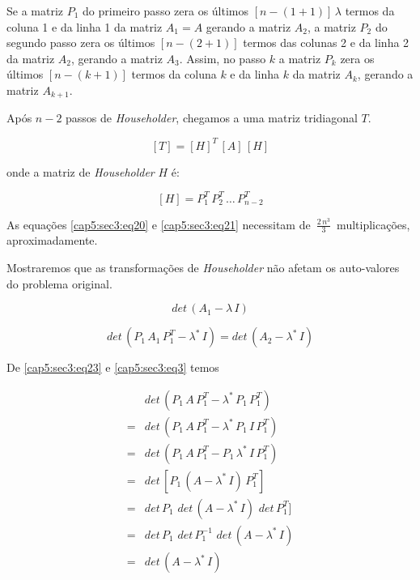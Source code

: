 Se a matriz $ P_1 $ do primeiro passo zera os últimos $ [n - (1+1)] \, \lambda $ termos da coluna 1 e da linha 1 da matriz $ A_1 = A $ gerando a matriz $ A_2 $, a matriz $ P_2 $ do segundo passo zera os últimos $ [n - (2+1)] $ termos das colunas 2 e da linha 2 da matriz $ A_2 $, gerando a matriz $ A_3 $. Assim, no passo $ k $ a matriz $ P_k $ zera os últimos $ [n - (k+1)] $ termos da coluna $ k $ e da linha $ k $ da matriz $ A_k $, gerando a matriz $ A_{k+1} $.

Após $ n-2 $ passos de \textit{Householder}, chegamos a uma matriz tridiagonal $ T $.

\begin{equation}
\label{cap5:sec3:eq20}
 [T] = [H]^T \, [A] \, [H]
\end{equation}

onde a matriz de \textit{Householder} $ H $ é:

\begin{equation}
\label{cap5:sec3:eq21}
 [H] = P_1^T \, P_2^T \, \ldots \, P_{n-2}^T
\end{equation}

As equações \ref{cap5:sec3:eq20} e \ref{cap5:sec3:eq21} necessitam de $ \, \displaystyle \frac{2 \, n^3}{3} \, $ multiplicações, aproximadamente.

\vspace*{1 mm}

Mostraremos que as transformações de \textit{Householder} não afetam os auto-valores do problema original.

\begin{equation}
\label{cap5:sec3:eq22}
 det \, (A_1 - \lambda \, I)
\end{equation}

\begin{equation}
\label{cap5:sec3:eq23}
 det \, (P_1 \, A_1 \, P_1^T - \lambda^* \, I) = det \, (A_2 - \lambda^* \, I)
\end{equation}

De \ref{cap5:sec3:eq23} e \ref{cap5:sec3:eq3} temos

\[
 \begin{array}{ll}
    & det \, (P_1 \, A \, P_1^T - \lambda^* \, P_1 \, P_1^T)\\[1mm]
  = & det \, (P_1 \, A \, P_1^T - \lambda^* \, P_1 \, I \, P_1^T)\\[1mm]
  = & det \, (P_1 \, A \, P_1^T - P_1 \, \lambda^* \, I \, P_1^T)\\[1mm]
  = & det \, [P_1 \, (A - \lambda^* \, I) \, P_1^T]\\[1mm]
  = & det \, P_1 \, \, det \, (A - \lambda^* \, I) \, \, det \, P_1^T]\\[1mm]
  = & det \, P_1 \, \, det \, P_1^{-1} \, \, det \, (A - \lambda^* \, I)\\[1mm]
  = & det \, (A - \lambda^* \, I)
 \end{array}
\]

